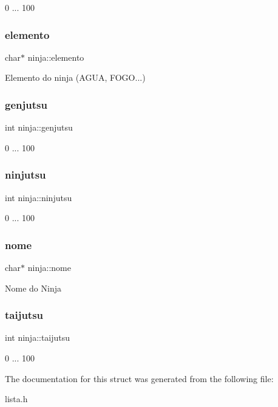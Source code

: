 0 ... 100 \mbox{\label{structninja_a0461035a441b95091803732b1bd4e76c}} 
\subsubsection{\texorpdfstring{elemento}{elemento}}
{\footnotesize\ttfamily char$\ast$ ninja\+::elemento}

Elemento do ninja (A\+G\+UA, F\+O\+GO...) \mbox{\label{structninja_adfb9e88d0513d41d9750134763f2cccd}} 
\subsubsection{\texorpdfstring{genjutsu}{genjutsu}}
{\footnotesize\ttfamily int ninja\+::genjutsu}

0 ... 100 \mbox{\label{structninja_a6b840282381ec6145bc4c2ef512b4b74}} 
\subsubsection{\texorpdfstring{ninjutsu}{ninjutsu}}
{\footnotesize\ttfamily int ninja\+::ninjutsu}

0 ... 100 \mbox{\label{structninja_a09c81900a27da1cf72d9b6f44b4051f2}} 
\subsubsection{\texorpdfstring{nome}{nome}}
{\footnotesize\ttfamily char$\ast$ ninja\+::nome}

Nome do Ninja \mbox{\label{structninja_aceb226ee3b2a48bc1bdfc29237adb5e5}} 
\subsubsection{\texorpdfstring{taijutsu}{taijutsu}}
{\footnotesize\ttfamily int ninja\+::taijutsu}

0 ... 100 

The documentation for this struct was generated from the following file\+:\begin{DoxyCompactItemize}
\item 
lista.\+h\end{DoxyCompactItemize}
